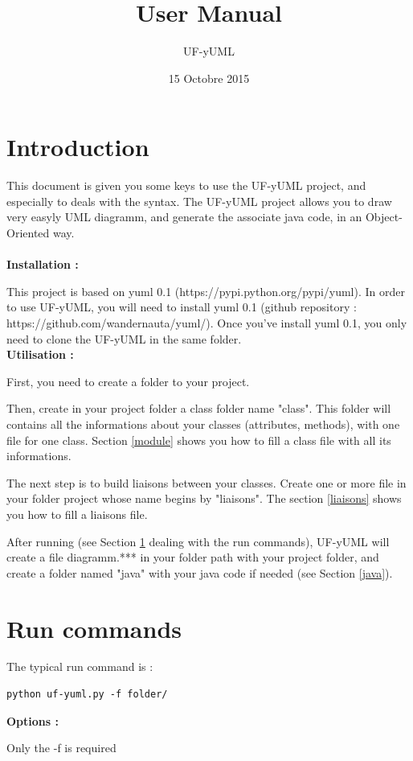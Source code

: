 \documentclass[a4paper,11pt]{article}
\date{15 Octobre 2015}
\title{User Manual}
\author{UF-yUML}
\begin{document}
\maketitle
\vskip 60pt
\section*{Introduction}
This document is given you some keys to use the UF-yUML project, and especially to deals with the syntax.
The UF-yUML project allows you to draw very easyly UML diagramm, and generate the associate java code, in an Object-Oriented way. \\ \\

\textbf{Installation :}

This project is based on yuml 0.1 (https://pypi.python.org/pypi/yuml). In order to use UF-yUML, you will need to install yuml 0.1 (github repository : https://github.com/wandernauta/yuml/).
Once you've install yuml 0.1, you only need to clone the UF-yUML in the same folder.\\

\textbf{Utilisation :}

First, you need to create a folder to your project.

Then, create in your project folder a class folder name "class". This folder will contains all the informations about your classes (attributes, methods), with one file for one class. Section \ref{module} shows you how to fill a class file with all its informations.

The next step is to build liaisons between your classes. Create one or more file in your folder project whose name begins by "liaisons". The section \ref{liaisons} shows you how to fill a liaisons file.

After running (see Section \ref{run} dealing with the run commands), UF-yUML will create a file diagramm.*** in your folder path with your project folder, and create a folder named "java" with your java code if needed (see Section \ref{java}).

\section{Run commands}
\label{run}
The typical run command is :
\begin{verbatim}
python uf-yuml.py -f folder/
\end{verbatim}
\textbf{Options :}

Only the -f is required
\end{document}
